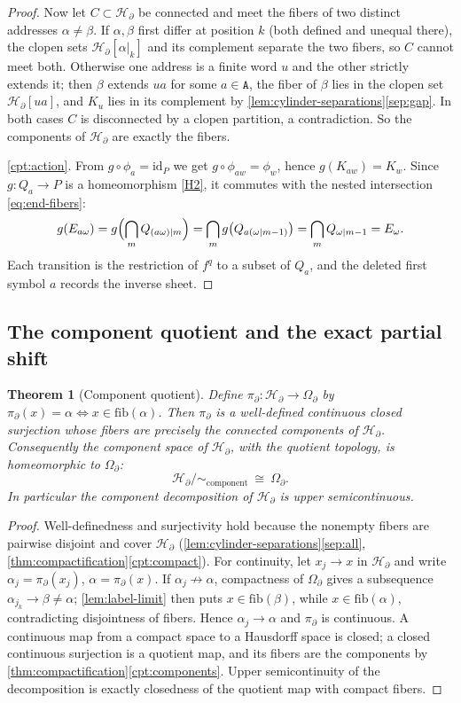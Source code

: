 \documentclass[11pt,reqno]{amsart}
\numberwithin{equation}{section}
\theoremstyle{plain}
\newtheorem{theorem}{Theorem}[section]
\theoremstyle{definition}
\theoremstyle{remark}
\newcommand{\A}{\mathtt A}
\newcommand{\OmB}{\Omega_\partial}
\newcommand{\HB}{\mathcal H_\partial}
\newcommand{\projB}{\pi_\partial}
\begin{document}
\begin{proof}
Now let $C\subset\HB$ be connected and meet the fibers of two distinct
addresses $\alpha\ne\beta$.  If $\alpha,\beta$ first differ at position
$k$ (both defined and unequal there), the clopen sets
$\HB[\alpha|_{k}]$ and its complement separate the two fibers, so $C$
cannot meet both.  Otherwise one address is a finite word $u$ and the
other strictly extends it; then $\beta$ extends $ua$ for some
$a\in\A$, the fiber of $\beta$ lies in the clopen set $\HB[ua]$, and
$K_u$ lies in its complement by
\cref{lem:cylinder-separations}\ref{sep:gap}.  In both cases $C$ is
disconnected by a clopen partition, a contradiction.  So the components
of $\HB$ are exactly the fibers.

\ref{cpt:action}.  From $g\circ\phi_a=\mathrm{id}_P$ we get
$g\circ\phi_{aw}=\phi_w$, hence $g(K_{aw})=K_w$.  Since
$g\colon Q_a\to P$ is a homeomorphism \ref{H2}, it commutes with the
nested intersection \eqref{eq:end-fibers}:
\[
 g(E_{a\omega})
 =
 g\Bigl(\bigcap_m Q_{(a\omega)|m}\Bigr)
 =
 \bigcap_m g\bigl(Q_{a(\omega|m-1)}\bigr)
 =
 \bigcap_m Q_{\omega|m-1}
 =E_\omega .
\]
Each transition is the restriction of $f^q$ to a subset of $Q_a$, and
the deleted first symbol $a$ records the inverse sheet.
\end{proof}

\subsection{The component quotient and the exact partial shift}

\begin{theorem}[Component quotient]
\label{thm:quotient}
Define $\projB\colon\HB\to\OmB$ by
$\projB(x)=\alpha\iff x\in\mathrm{fib}(\alpha)$.  Then $\projB$ is a
well-defined continuous closed surjection whose fibers are precisely
the connected components of $\HB$.  Consequently the component space of
$\HB$, with the quotient topology, is homeomorphic to $\OmB$:
\[
 \HB/\!\sim_{\text{component}}
 \ \cong\
 \OmB .
\]
In particular the component decomposition of $\HB$ is upper
semicontinuous.
\end{theorem}

\begin{proof}
Well-definedness and surjectivity hold because the nonempty fibers are
pairwise disjoint and cover $\HB$
(\cref{lem:cylinder-separations}\ref{sep:all},
\cref{thm:compactification}\ref{cpt:compact}).  For continuity, let
$x_j\to x$ in $\HB$ and write $\alpha_j=\projB(x_j)$,
$\alpha=\projB(x)$.  If $\alpha_j\not\to\alpha$, compactness of $\OmB$
gives a subsequence $\alpha_{j_k}\to\beta\ne\alpha$;
\cref{lem:label-limit} then puts $x\in\mathrm{fib}(\beta)$, while
$x\in\mathrm{fib}(\alpha)$, contradicting disjointness of fibers.
Hence $\alpha_j\to\alpha$ and $\projB$ is continuous.  A continuous map
from a compact space to a Hausdorff space is closed; a closed
continuous surjection is a quotient map, and its fibers are the
components by \cref{thm:compactification}\ref{cpt:components}.  Upper
semicontinuity of the decomposition is exactly closedness of the
quotient map with compact fibers.
\end{proof}
\end{document}
